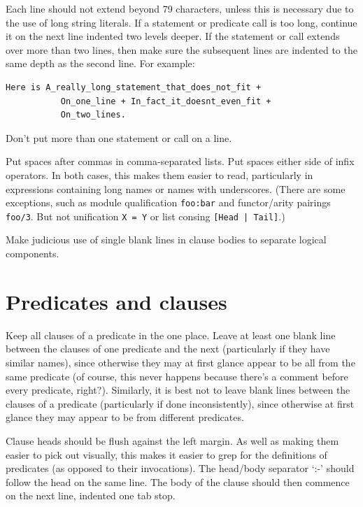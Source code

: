 \documentclass[a4paper,12pt]{report}
\begin{document}
Each line should not extend beyond 79 characters, unless this is necessary
due to the use of long string literals.  If a statement or predicate call
is too long, continue it on the next line indented two levels deeper.
If the statement or call extends over more than two lines, then make sure
the subsequent lines are indented to the same depth as the second line.
For example:

\begin{verbatim}
Here is A_really_long_statement_that_does_not_fit +
           On_one_line + In_fact_it_doesnt_even_fit +
           On_two_lines.
\end{verbatim}
Don't put more than one statement or call on a line.

Put spaces after commas in comma-separated lists.  Put spaces either
side of infix operators.  In both cases, this makes them easier to read,
particularly in expressions containing long names or names with underscores.
(There are some exceptions, such as module qualification \verb^foo:bar^ and
functor/arity pairings \verb^foo/3^.  But not unification \verb^X = Y^ or list consing
\verb^[Head | Tail]^.)

Make judicious use of single blank lines in clause bodies to separate logical
components.


\section{Predicates and clauses}

Keep all clauses of a predicate in the one place.  Leave at least one
blank line between the clauses of one predicate and the next (particularly
if they have similar names), since otherwise they may at first glance
appear to be all from the same predicate (of course, this never happens
because there's a comment before every predicate, right?).  Similarly,
it is best not to leave blank lines between the clauses of a predicate
(particularly if done inconsistently), since otherwise at first glance
they may appear to be from different predicates.

Clause heads should be flush against the left margin.  As well as making
them easier to pick out visually, this makes it easier to grep for the
definitions of predicates (as opposed to their invocations).  The head/body
separator `:-' should follow the head on the same line.  The body of the
clause should then commence on the next line, indented one tab stop.
\end{document}
